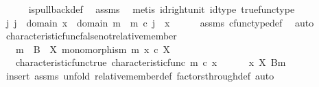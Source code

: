 \begin{isabellebody}
\ \ \ \ \isamarkupfalse%
\ is{\isacharunderscore}{\kern0pt}pullback{\isacharunderscore}{\kern0pt}def\ \isamarkupfalse%
\ assms\ \isamarkupfalse%
\ {\isacharparenleft}{\kern0pt}metis\ id{\isacharunderscore}{\kern0pt}right{\isacharunderscore}{\kern0pt}unit{}\ id{\isacharunderscore}{\kern0pt}type\ true{\isacharunderscore}{\kern0pt}func{\isacharunderscore}{\kern0pt}type{\isacharparenright}{\kern0pt}\isanewline
\ \ \isamarkupfalse%
\ \isamarkupfalse%
\ {\isachardoublequoteopen}{\isasymexists}j{\isachardot}{\kern0pt}\ j\ {\isacharcolon}{\kern0pt}\ domain\ x\ {\isasymrightarrow}\ domain\ m\ {\isasymand}\ m\ {\isasymcirc}\isactrlsub c\ j\ {\isacharequal}{\kern0pt}\ x{\isachardoublequoteclose}\isanewline
\ \ \ \ \isamarkupfalse%
\ assms{\isacharparenleft}{\kern0pt}{}{\isacharcomma}{\kern0pt}{}{\isacharparenright}{\kern0pt}\ cfunc{\isacharunderscore}{\kern0pt}type{\isacharunderscore}{\kern0pt}def\ \isamarkupfalse%
\ auto\isanewline
{}\isamarkupfalse%
%
\endisatagproof
{\isafoldproof}%
%
\isadelimproof
\isanewline
%
\endisadelimproof
\isanewline
{}\isamarkupfalse%
\ characteristic{\isacharunderscore}{\kern0pt}func{\isacharunderscore}{\kern0pt}false{\isacharunderscore}{\kern0pt}not{\isacharunderscore}{\kern0pt}relative{\isacharunderscore}{\kern0pt}member{\isacharcolon}{\kern0pt}\isanewline
\ \ \ {\isachardoublequoteopen}m\ {\isacharcolon}{\kern0pt}\ B\ {\isasymrightarrow}\ X{\isachardoublequoteclose}\ {\isachardoublequoteopen}monomorphism\ m{\isachardoublequoteclose}\ {\isachardoublequoteopen}x\ {\isasymin}\isactrlsub c\ X{\isachardoublequoteclose}\isanewline
\ \ \ characteristic{\isacharunderscore}{\kern0pt}func{\isacharunderscore}{\kern0pt}true{\isacharcolon}{\kern0pt}\ {\isachardoublequoteopen}characteristic{\isacharunderscore}{\kern0pt}func\ m\ {\isasymcirc}\isactrlsub c\ x\ {\isacharequal}{\kern0pt}\ {\isasymf}{\isachardoublequoteclose}\isanewline
\ \ \ {\isachardoublequoteopen}{\isasymnot}\ {\isacharparenleft}{\kern0pt}x\ {\isasymin}\isactrlbsub X\isactrlesub \ {\isacharparenleft}{\kern0pt}B{\isacharcomma}{\kern0pt}m{\isacharparenright}{\kern0pt}{\isacharparenright}{\kern0pt}{\isachardoublequoteclose}\isanewline
%
\isadelimproof
%
\endisadelimproof
%
\isatagproof
{}\isamarkupfalse%
\ {\isacharparenleft}{\kern0pt}insert\ assms{\isacharcomma}{\kern0pt}\ unfold\ relative{\isacharunderscore}{\kern0pt}member{\isacharunderscore}{\kern0pt}def{}\ factors{\isacharunderscore}{\kern0pt}through{\isacharunderscore}{\kern0pt}def{\isacharcomma}{\kern0pt}\ auto{\isacharparenright}{\kern0pt}\isanewline

\end{isabellebody}
